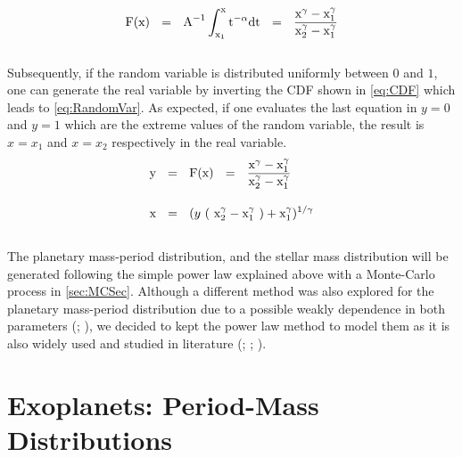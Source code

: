 \begingroup
\Large
\begin{equation}
 \textnormal{F}(\textnormal{x})~~=~~\textnormal{A}^{-1} \int_{\textnormal{x}_1}^{\textnormal{x}} \textnormal{t}^{-\alpha} \textnormal{dt}~~=~~\frac{\textnormal{x}^{\gamma} - \textnormal{x}_1^{\gamma}}{\textnormal{x}_2^{\gamma} - \textnormal{x}_1^{\gamma}}
 \label{eq:CDF}
\end{equation}
\endgroup\\

Subsequently, if the random variable is distributed uniformly between $0$ and $1$, one can generate the real variable by inverting the CDF shown in \autoref{eq:CDF} which leads to \autoref{eq:RandomVar}. As expected, if one evaluates the last equation in $y = 0$ and $y = 1$ which are the extreme values of the random variable, the result is $x = x_1$ and $x = x_2$ respectively in the real variable.\\

\begingroup
\Large
\begin{equation}
  \begin{align*}
    \textnormal{y} & ~~=~~  \textnormal{F}(\textnormal{x}) ~~=~~ \frac{\textnormal{x}^{\gamma} - \textnormal{x}_1^{\gamma}}{\textnormal{x}_2^{\gamma} - \textnormal{x}_1^{\gamma}} \\[10pt]
    \textnormal{x} & ~~=~~  (y~ (~\textnormal{x}_2^{\gamma} - \textnormal{x}_1^{\gamma}~) + \textnormal{x}_1^{\gamma})^{1/\gamma}
    \label{eq:RandomVar}
  \end{align*}
\end{equation}
\endgroup\\

The planetary mass-period distribution, and the stellar mass distribution will be generated following the simple power law explained above with a Monte-Carlo process in \autoref{sec:MCSec}. Although a different method was also explored for the planetary mass-period distribution due to a possible weakly dependence in both parameters (\citeyear{1538-3881-134-5-2061}; \citeyear{2002ApJ...568L.113Z}), we decided to kept the power law method to model them as it is also widely used and studied in literature (\citeyear{2010EAS....41..107N}; \citeyear{2008PASP..120..531C}; \citeyear{2006ApJ...646..505B}).  

\section{Exoplanets: Period-Mass Distributions}\label{ref:PM_ExoPlanet}

